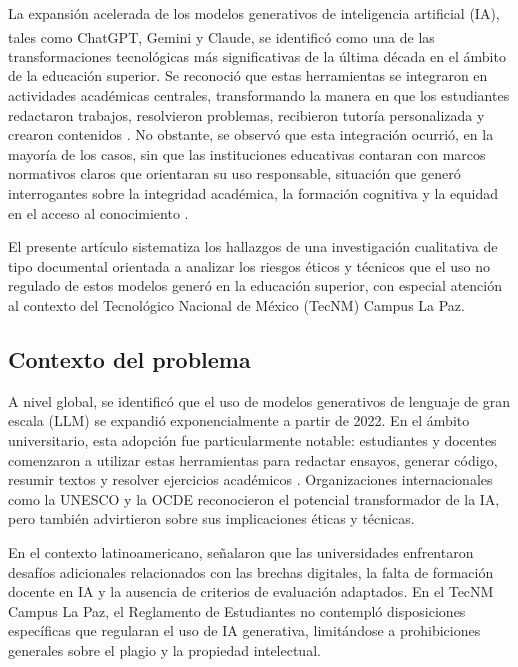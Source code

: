 \documentclass[review]{elsarticle}
\begin{document}
	La expansión acelerada de los modelos generativos de inteligencia artificial (IA), tales como ChatGPT\textsuperscript{\textregistered}, Gemini\textsuperscript{\textregistered} y Claude\textsuperscript{\textregistered}, se identificó como una de las transformaciones tecnológicas más significativas de la última década en el ámbito de la educación superior. Se reconoció que estas herramientas se integraron en actividades académicas centrales, transformando la manera en que los estudiantes redactaron trabajos, resolvieron problemas, recibieron tutoría personalizada y crearon contenidos \citep{lim2024, yan2023}. No obstante, se observó que esta integración ocurrió, en la mayoría de los casos, sin que las instituciones educativas contaran con marcos normativos claros que orientaran su uso responsable, situación que generó interrogantes sobre la integridad académica, la formación cognitiva y la equidad en el acceso al conocimiento \citep{guzmanvaldivia2024}.
	
	El presente artículo sistematiza los hallazgos de una investigación cualitativa de tipo documental orientada a analizar los riesgos éticos y técnicos que el uso no regulado de estos modelos generó en la educación superior, con especial atención al contexto del Tecnológico Nacional de México (TecNM) Campus La Paz.
	
	\subsection{Contexto del problema}
	
	A nivel global, se identificó que el uso de modelos generativos de lenguaje de gran escala (LLM) se expandió exponencialmente a partir de 2022. En el ámbito universitario, esta adopción fue particularmente notable: estudiantes y docentes comenzaron a utilizar estas herramientas para redactar ensayos, generar código, resumir textos y resolver ejercicios académicos \citep{yan2023}. Organizaciones internacionales como la UNESCO \citep{unesco2021} y la OCDE \citep{oecd2019} reconocieron el potencial transformador de la IA, pero también advirtieron sobre sus implicaciones éticas y técnicas.
	
	En el contexto latinoamericano, \citet{ramirezchavez2025} señalaron que las universidades enfrentaron desafíos adicionales relacionados con las brechas digitales, la falta de formación docente en IA y la ausencia de criterios de evaluación adaptados. En el TecNM Campus La Paz, el Reglamento de Estudiantes \citep{tecnm2023} no contempló disposiciones específicas que regularan el uso de IA generativa, limitándose a prohibiciones generales sobre el plagio y la propiedad intelectual.
	
\end{document}
